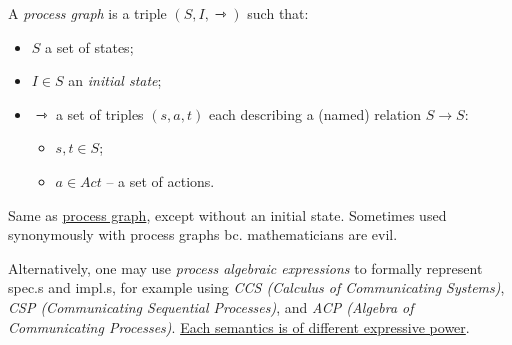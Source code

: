 \documentclass[99-notes-packed.tex]{subfiles}
\begin{document}
\begin{definition}
    A \textit{process graph} is a triple $(S, I, \rightarrowtriangle)$ such that:
    \begin{itemize}
        \item $S$ a set of states;
        \item $I \in S$ an \textit{initial state};
        \item {
            $\rightarrowtriangle$ a set of triples $(s, a, t)$ each describing a (named) relation $S \rightarrow S$:
            \begin{itemize}
                \item $s, t \in S$;
                \item $a \in {Act}$ -- a set of actions.
            \end{itemize}
        }
    \end{itemize}
    \label{def.process-graph}
\end{definition}

\begin{definition}[LTS]
    Same as \hyperref[def.process-graph]{process graph}, except without an initial state. Sometimes used synonymously with process graphs bc. mathematicians are evil.
\end{definition}

Alternatively, one may use \textit{process algebraic expressions} to formally represent spec.s and impl.s, for example using \textit{CCS (Calculus of Communicating Systems)}, \textit{CSP (Communicating Sequential Processes)}, and \textit{ACP (Algebra of Communicating Processes)}. \underline{Each semantics is of different expressive power}.
\end{document}
